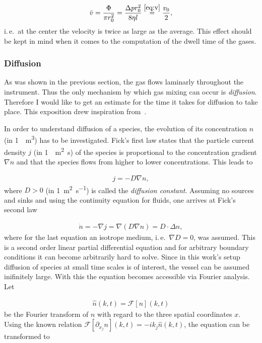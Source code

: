 \begin{align*}
  \bar v = \frac{\Phi}{\pi r_0^2} = \frac{\Delta p r_0^2}{8\eta l} \stackrel{\eqref{eq:v}}{=} \frac{v_0}{2},
\end{align*}
i.\,e.\ at the center the velocity is twice as large as the
average. This effect should be kept in mind when it comes to the
computation of the dwell time of the gases.

\subsubsection{Diffusion}
\label{sec:diffusion}

As was shown in the previous section, the gas flows laminarly
throughout the instrument. Thus the only mechanism by which gas mixing
can occur is \emph{diffusion}. Therefore I would like to get an
estimate for the time it takes for diffusion to take place. This
exposition drew inspiration from~\cite{fluid}.

In order to understand diffusion of a species, the evolution of its
concentration $n$ (in \SI{1}{\per\cubic\meter}) has to be
investigated. Fick's first law states that the particle current
density $j$ (in \SI{1}{\per\square\meter\second}) of the species is
proportional to the concentration gradient $\nabla n$ and that the
species flows from higher to lower concentrations. This leads to

\begin{align*}
  j = - D \nabla n,
\end{align*}
where $D > 0$ (in \SI{1}{\square\meter\per\second}) is called the
\emph{diffusion constant}. Assuming no sources and sinks and using the
continuity equation for fluids, one arrives at Fick's second law

\begin{align*}
  \dot n = - \nabla j = \nabla (D \nabla n) = D \cdot \Delta n,
\end{align*}
where for the last equation an isotrope medium, i.\,e.\
$\nabla D = 0$, was assumed. This is a second order linear partial
differential equation and for arbitrary boundary conditions it can
become arbitrarily hard to solve. Since in this work's setup diffusion
of species at small time scales is of interest, the vessel can be
assumed inifinitely large. With this the equation becomes accessible
via Fourier analysis. Let

\begin{align*}
  \hat n(k,t) = \mathcal{F}[n](k,t)
\end{align*}
be the Fourier transform of $n$ with regard to the three spatial
coordinates $x$. Using the known relation $\mathcal{F}[\partial_{x_j}
n](k,t) = -ik_j \hat n(k,t)$, the equation can be transformed to

